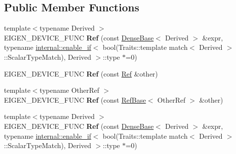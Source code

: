 \subsection*{Public Member Functions}
\begin{DoxyCompactItemize}
\item 
\mbox{\label{class_eigen_1_1_ref_3_01const_01_t_plain_object_type_00_01_options_00_01_stride_type_01_4_a6624f9a5339cb39c6e2d8caa04263eb8}} 
{\footnotesize template$<$typename Derived $>$ }\\E\+I\+G\+E\+N\+\_\+\+D\+E\+V\+I\+C\+E\+\_\+\+F\+U\+NC {\bfseries Ref} (const \hyperlink{group___core___module_class_eigen_1_1_dense_base}{Dense\+Base}$<$ Derived $>$ \&expr, typename \hyperlink{struct_eigen_1_1internal_1_1enable__if}{internal\+::enable\+\_\+if}$<$ bool(Traits\+::template match$<$ Derived $>$\+::Scalar\+Type\+Match), Derived $>$\+::type $\ast$=0)
\item 
\mbox{\label{class_eigen_1_1_ref_3_01const_01_t_plain_object_type_00_01_options_00_01_stride_type_01_4_af70bee1d7a4346cb69f2e3ff9f3bd6b2}} 
E\+I\+G\+E\+N\+\_\+\+D\+E\+V\+I\+C\+E\+\_\+\+F\+U\+NC {\bfseries Ref} (const \hyperlink{group___core___module_class_eigen_1_1_ref}{Ref} \&other)
\item 
\mbox{\label{class_eigen_1_1_ref_3_01const_01_t_plain_object_type_00_01_options_00_01_stride_type_01_4_a3fb134869debdf939a02490b549df2a7}} 
{\footnotesize template$<$typename Other\+Ref $>$ }\\E\+I\+G\+E\+N\+\_\+\+D\+E\+V\+I\+C\+E\+\_\+\+F\+U\+NC {\bfseries Ref} (const \hyperlink{class_eigen_1_1_ref_base}{Ref\+Base}$<$ Other\+Ref $>$ \&other)
\item 
\mbox{\label{class_eigen_1_1_ref_3_01const_01_t_plain_object_type_00_01_options_00_01_stride_type_01_4_a6624f9a5339cb39c6e2d8caa04263eb8}} 
{\footnotesize template$<$typename Derived $>$ }\\E\+I\+G\+E\+N\+\_\+\+D\+E\+V\+I\+C\+E\+\_\+\+F\+U\+NC {\bfseries Ref} (const \hyperlink{group___core___module_class_eigen_1_1_dense_base}{Dense\+Base}$<$ Derived $>$ \&expr, typename \hyperlink{struct_eigen_1_1internal_1_1enable__if}{internal\+::enable\+\_\+if}$<$ bool(Traits\+::template match$<$ Derived $>$\+::Scalar\+Type\+Match), Derived $>$\+::type $\ast$=0)

\end{DoxyCompactItemize}
